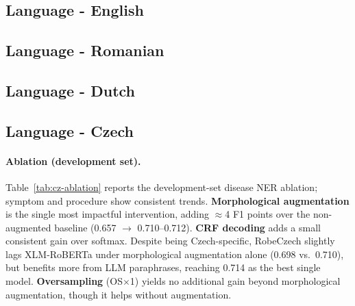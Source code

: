 \documentclass[11pt]{article}
\begin{document}
\subsection{Language - English}

\subsection{Language - Romanian}

\subsection{Language - Dutch}

\subsection{Language - Czech}
\label{sec:results-cz}


\paragraph{Ablation (development set).}
Table~\ref{tab:cz-ablation} reports the development-set disease NER ablation;
symptom and procedure show consistent trends.
\textbf{Morphological augmentation} is the single most impactful intervention,
adding $\approx$4 F1 points over the non-augmented baseline (0.657 $\to$ 0.710--0.712).
\textbf{CRF decoding} adds a small consistent gain over softmax.
Despite being Czech-specific, RobeCzech slightly lags XLM-RoBERTa under morphological
augmentation alone (0.698 vs.\ 0.710), but benefits more from LLM paraphrases, reaching
0.714 as the best single model.
\textbf{Oversampling} (OS$\times$1) yields no additional gain beyond morphological
augmentation, though it helps without augmentation.
\end{document}
